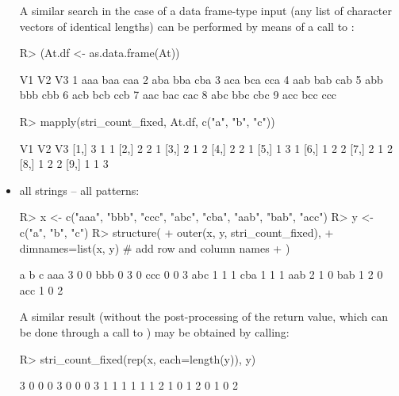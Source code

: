 \documentclass[nojss]{jss}\usepackage[]{graphicx}\usepackage[]{color}
\begin{document}
\begin{itemize}
A similar search in the case of a data frame-type input
(any list of character vectors of identical lengths)
can be performed by means of a call to :



\begin{Schunk}
\begin{Sinput}
R> (At.df <- as.data.frame(At))
\end{Sinput}
\begin{Soutput}
   V1  V2  V3
1 aaa baa caa
2 aba bba cba
3 aca bca cca
4 aab bab cab
5 abb bbb cbb
6 acb bcb ccb
7 aac bac cac
8 abc bbc cbc
9 acc bcc ccc
\end{Soutput}
\begin{Sinput}
R> mapply(stri_count_fixed, At.df, c("a", "b", "c"))
\end{Sinput}
\begin{Soutput}
      V1 V2 V3
 [1,]  3  1  1
 [2,]  2  2  1
 [3,]  2  1  2
 [4,]  2  2  1
 [5,]  1  3  1
 [6,]  1  2  2
 [7,]  2  1  2
 [8,]  1  2  2
 [9,]  1  1  3
\end{Soutput}
\end{Schunk}

\item all strings -- all patterns:

\begin{Schunk}
\begin{Sinput}
R> x <- c("aaa", "bbb", "ccc", "abc", "cba", "aab", "bab", "acc")
R> y <- c("a", "b", "c")
R> structure(
+    outer(x, y, stri_count_fixed),
+    dimnames=list(x, y)  # add row and column names
+  )
\end{Sinput}
\begin{Soutput}
    a b c
aaa 3 0 0
bbb 0 3 0
ccc 0 0 3
abc 1 1 1
cba 1 1 1
aab 2 1 0
bab 1 2 0
acc 1 0 2
\end{Soutput}
\end{Schunk}

A similar result (without the post-processing of the return value,
which can be done through a call to )
may be obtained by calling:

\begin{Schunk}
\begin{Sinput}
R> stri_count_fixed(rep(x, each=length(y)), y)
\end{Sinput}
\begin{Soutput}
 [1] 3 0 0 0 3 0 0 0 3 1 1 1 1 1 1 2 1 0 1 2 0 1 0 2
\end{Soutput}
\end{Schunk}


\end{itemize}
\end{document}
